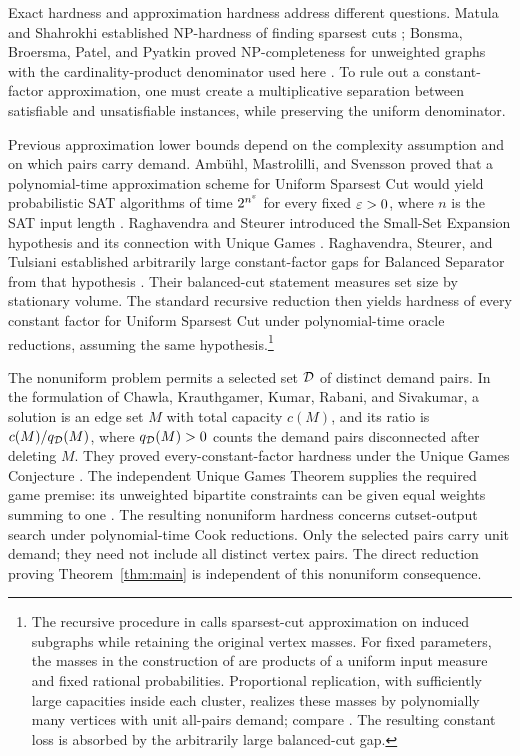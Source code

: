 Exact hardness and approximation hardness address different questions.
Matula and Shahrokhi established NP-hardness of finding sparsest cuts
\cite{MatulaShahrokhi1990}; Bonsma, Broersma, Patel, and Pyatkin proved
NP-completeness for unweighted graphs with the cardinality-product
denominator used here \cite[Theorem~15]{BBPP2012}.
To rule out a constant-factor approximation, one must create a
multiplicative separation between satisfiable and unsatisfiable instances,
while preserving the uniform denominator.

Previous approximation lower bounds depend on the complexity assumption
and on which pairs carry demand. Amb\"uhl, Mastrolilli, and Svensson proved
that a polynomial-time approximation scheme for Uniform Sparsest Cut
would yield probabilistic SAT algorithms of time $2^{n^\varepsilon}$ for every
fixed $\varepsilon>0$, where $n$ is the SAT input length
\cite[Theorem~1.3]{AMS2011}. Raghavendra and Steurer introduced the
Small-Set Expansion hypothesis and its connection with Unique Games
\cite{RaghavendraSteurer2010}. Raghavendra, Steurer, and Tulsiani
established arbitrarily large constant-factor gaps for Balanced Separator
from that hypothesis
\cite[full version, Theorem~3.5 and Corollary~3.6]{RST2012}.
Their balanced-cut statement measures set size by stationary volume.
The standard recursive reduction then yields hardness of every constant
factor for Uniform Sparsest Cut under polynomial-time oracle reductions,
assuming the same hypothesis.\footnote{The recursive procedure in
\cite[Section~3.3]{LeightonRao1999} calls sparsest-cut approximation on
induced subgraphs while retaining the original vertex masses. For fixed
parameters, the masses in the construction of \cite[Section~6]{RST2012}
are products of a uniform input measure and fixed rational probabilities.
Proportional replication, with sufficiently large capacities inside each
cluster, realizes these masses by polynomially many vertices with unit
all-pairs demand; compare \cite[Section~2]{ARV2009}. The resulting
constant loss is absorbed by the arbitrarily large balanced-cut gap.}

The nonuniform problem permits a selected set $\mathcal D$ of distinct demand
pairs. In the formulation of Chawla, Krauthgamer, Kumar, Rabani, and
Sivakumar, a solution is an edge set $M$ with total capacity $c(M)$, and
its ratio is $c(M)/q_\mathcal D(M)$, where $q_\mathcal D(M)>0$ counts the demand pairs
disconnected after deleting $M$.
They proved every-constant-factor hardness under the Unique Games
Conjecture \cite[Corollary~1.3 and p.~99]{CKKRS2006}.
The independent Unique Games Theorem supplies the required game premise:
its unweighted bipartite constraints can be given equal weights summing
to one \cite[Theorem~1.1 and Corollary~8.3]{OpenAIUniqueGames2026}.
The resulting nonuniform hardness concerns cutset-output search under
polynomial-time Cook reductions. Only the selected pairs carry unit
demand; they need not include all distinct vertex pairs.
The direct reduction proving Theorem~\ref{thm:main} is independent of
this nonuniform consequence.

